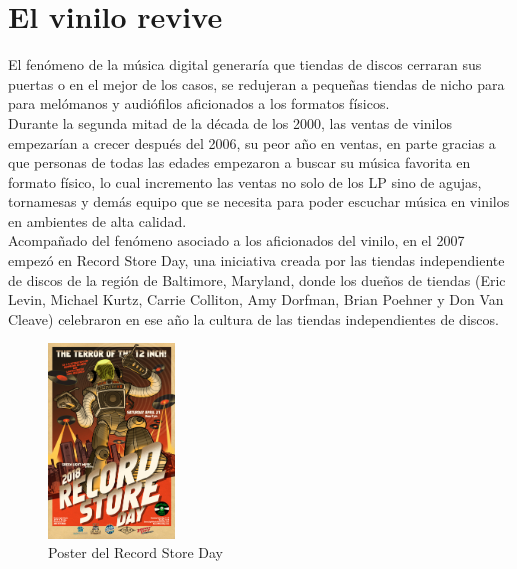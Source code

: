 \documentclass{article}
\begin{document}
\section{El vinilo revive}

El fenómeno de la música digital generaría que tiendas de discos cerraran sus puertas o en el mejor de los casos, se redujeran a pequeñas tiendas de nicho para para melómanos y audiófilos aficionados a los formatos físicos.\\

Durante la segunda mitad de la década de los 2000, las ventas de vinilos empezarían a crecer después del 2006, su peor año en ventas, en parte gracias a que personas de todas las edades empezaron a buscar su música favorita en formato físico, lo cual incremento las ventas no solo de los LP sino de agujas, tornamesas y demás equipo que se necesita para poder escuchar música en vinilos en ambientes de alta calidad.\cite{youtube}\\

Acompañado del fenómeno asociado a los aficionados del vinilo, en el 2007 empezó en Record Store Day, una iniciativa creada por las tiendas independiente de discos de la región de Baltimore, Maryland, donde los dueños de tiendas (Eric Levin, Michael Kurtz, Carrie Colliton, Amy Dorfman, Brian Poehner y Don Van Cleave) celebraron en ese año la cultura de las tiendas independientes de discos.\cite{wikiRSD}\\

\begingroup
\setlength{\intextsep}{0pt}%
\setlength{\columnsep}{0pt}%

\begin{figure}
    \centering
    \includegraphics[width=0.3\textwidth]{images/recordday.jpg}
    \vspace{-5pt}
    \caption{Poster del Record Store Day}
\end{figure}
\end{document}
